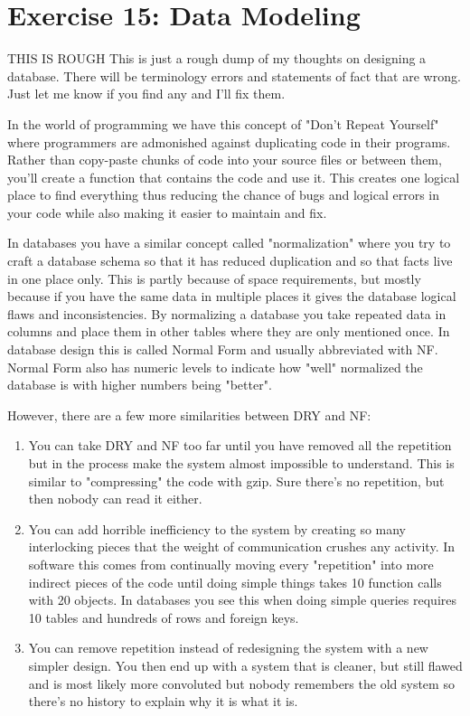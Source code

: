 \chapter{Exercise 15: Data Modeling}

\begin{note}{THIS IS ROUGH}
This is just a rough dump of my thoughts on designing a database.  There will be
terminology errors and statements of fact that are wrong.  Just let me know if you
find any and I'll fix them.
\end{note}

In the world of programming we have this concept of "Don't Repeat Yourself" where programmers
are admonished against duplicating code in their programs.  Rather than copy-paste chunks of
code into your source files or between them, you'll create a function that contains the code
and use it.  This creates one logical place to find everything thus reducing the chance of
bugs and logical errors in your code while also making it easier to maintain and fix.

In databases you have a similar concept called "normalization" where you try to
craft a database schema so that it has reduced duplication and so that facts
live in one place only.  This is partly because of space requirements, but
mostly because if you have the same data in multiple places it gives the
database logical flaws and inconsistencies.  By normalizing a database you take
repeated data in columns and place them in other tables where they are only mentioned 
once.  In database design this is called Normal Form and usually abbreviated with
NF.  Normal Form also has numeric levels to indicate how "well" normalized the
database is with higher numbers being "better".


However, there are a few more similarities between DRY and NF:

\begin{enumerate}
\item You can take DRY and NF too far until you have removed all the repetition
    but in the process make the system almost impossible to understand.  This is similar
    to "compressing" the code with gzip.  Sure there's no repetition, but then nobody can
    read it either.
\item You can add horrible inefficiency to the system by creating so many interlocking pieces
    that the weight of communication crushes any activity.  In software this comes from 
    continually moving every "repetition" into more indirect pieces of the code until doing
    simple things takes 10 function calls with 20 objects.  In databases you see this when
    doing simple queries requires 10 tables and hundreds of rows and foreign keys.
\item You can remove repetition instead of redesigning the system with a new simpler design.
    You then end up with a system that is cleaner, but still flawed and is most likely more
    convoluted but nobody remembers the old system so there's no history to explain why
    it is what it is.
\end{enumerate}

